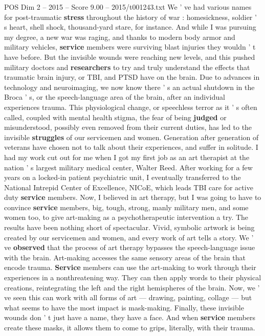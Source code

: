 \begin{textsample}{POS Dim 2 – 2015 – Score 9.00 – 2015/t001243.txt}
We ' ve had various names for post-traumatic \textbf{stress} throughout the history of war : homesickness, soldier ' s heart, shell shock, thousand-yard stare, for instance.
And while I was pursuing my degree, a new war was raging, and thanks to modern body armor and military vehicles, \textbf{service} members were surviving blast injuries they wouldn ' t have before.
But the invisible wounds were reaching new levels, and this pushed military doctors and \textbf{researchers} to try and truly understand the effects that traumatic brain injury, or TBI, and PTSD have on the brain.
Due to advances in technology and neuroimaging, we now know there ' s an actual shutdown in the Broca ' s, or the speech-language area of the brain, after an individual experiences trauma.
This physiological change, or speechless terror as it ' s often called, coupled with mental health stigma, the fear of being \textbf{judged} or misunderstood, possibly even removed from their current duties, has led to the invisible \textbf{struggles} of our servicemen and women.
Generation after generation of veterans have chosen not to talk about their experiences, and suffer in solitude.
I had my work cut out for me when I got my first job as an art therapist at the nation ' s largest military medical center, Walter Reed.
After working for a few years on a locked-in patient psychiatric unit, I eventually transferred to the National Intrepid Center of Excellence, NICoE, which leads TBI care for active duty \textbf{service} members.
Now, I believed in art therapy, but I was going to have to convince \textbf{service} members, big, tough, strong, manly military men, and some women too, to give art-making as a psychotherapeutic intervention a try.
The results have been nothing short of spectacular.
Vivid, symbolic artwork is being created by our servicemen and women, and every work of art tells a story.
We ' ve \textbf{observed} that the process of art therapy bypasses the speech-language issue with the brain.
Art-making accesses the same sensory areas of the brain that encode trauma. \textbf{Service} members can use the art-making to work through their experiences in a nonthreatening way.
They can then apply words to their physical creations, reintegrating the left and the right hemispheres of the brain.
Now, we ' ve seen this can work with all forms of art — drawing, painting, collage — but what seems to have the most impact is mask-making.
Finally, these invisible wounds don ' t just have a name, they have a face.
And when \textbf{service} members create these masks, it allows them to come to grips, literally, with their trauma.

\end{textsample}
